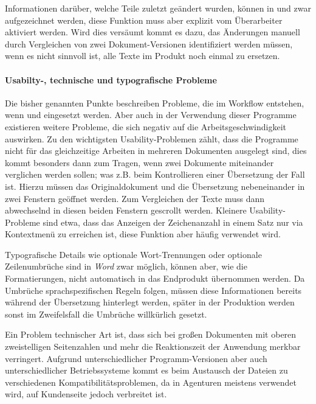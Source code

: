 Informationen darüber, welche Teile zuletzt geändert wurden, können in  und  zwar aufgezeichnet werden, diese Funktion muss aber explizit vom Überarbeiter aktiviert werden. Wird dies versäumt kommt es dazu, das Änderungen manuell durch Vergleichen von zwei Dokument-Versionen identifiziert werden müssen, wenn es nicht sinnvoll ist, alle Texte im Produkt noch einmal zu ersetzen.

\paragraph{Usabilty-, technische und typografische Probleme} Die bisher genannten Punkte beschreiben Probleme, die im Workflow entstehen, wenn  und  eingesetzt werden. Aber auch in der Verwendung dieser Programme existieren weitere Probleme, die sich negativ auf die Arbeitsgeschwindigkeit auswirken. Zu den wichtigsten Usability-Problemen zählt, dass die Programme nicht für das gleichzeitige Arbeiten in mehreren Dokumenten ausgelegt sind, dies kommt besonders dann zum Tragen, wenn zwei Dokumente miteinander verglichen werden sollen; was z.B. beim Kontrollieren einer Übersetzung der Fall ist. Hierzu müssen das Originaldokument und die Übersetzung nebeneinander in zwei Fenstern geöffnet werden. Zum Vergleichen der Texte muss dann abwechselnd in diesen beiden Fenstern gescrollt werden. Kleinere Usability-Probleme sind etwa, dass das Anzeigen der Zeichenanzahl in einem Satz nur via Kontextmenü zu erreichen ist, diese Funktion aber häufig verwendet wird. 

Typografische Details wie optionale Wort-Trennungen oder optionale Zeilenumbrüche sind in \emph{Word} zwar möglich, können aber, wie die Formatierungen, nicht automatisch in das Endprodukt übernommen werden. Da Umbrüche sprachspezifischen Regeln folgen, müssen diese Informationen bereits während der Übersetzung hinterlegt werden, später in der Produktion werden sonst im Zweifelsfall die Umbrüche willkürlich gesetzt. 

Ein Problem technischer Art ist, dass sich bei großen Dokumenten mit oberen zweistelligen Seitenzahlen und mehr die Reaktionszeit der Anwendung merkbar verringert. Aufgrund unterschiedlicher Programm-Versionen aber auch unterschiedlicher Betriebssysteme kommt es beim Austausch der Dateien zu verschiedenen Kompatibilitätsproblemen, da in Agenturen meistens  verwendet wird, auf Kundenseite jedoch  verbreitet ist.

